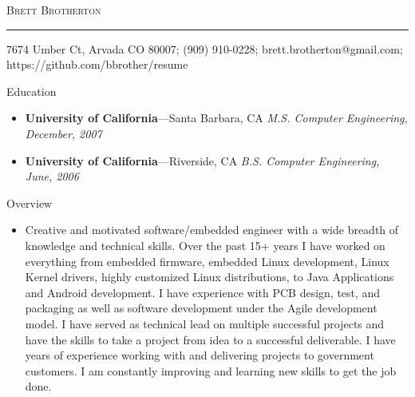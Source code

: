 \documentclass[10pt,oneside]{article}
\makeatletter
\newcommand{\name}{Brett Brotherton}
\newcommand{\addr}{7674 Umber Ct, Arvada CO 80007}
\newcommand{\phone}{(909) 910-0228}
\newcommand{\email}{brett.brotherton@gmail.com}
\newcommand{\website}{https://github.com/bbrother/resume}
\newcommand{\bigname}[1]{
  \begin{center}\fontfamily{cmr}\selectfont\Huge\scshape#1\end{center}
}
\newenvironment{ressection}[1]{
  \vspace{-2pt}
  {\fontfamily{cmr}\selectfont\Large#1}
  \begin{itemize}
  \vspace{-1pt}
}{
  \end{itemize}
}
\newcommand{\resitem}[1]{
  \vspace{-4pt}
  \item \begin{flushleft} #1 \end{flushleft}
}
\newcommand{\resbigitem}[3]{
  \vspace{-5pt}
  \item
  \textbf{#1}---#2 \hfill \textit{#3}
}
\newenvironment{ressubsec2}[3]{
  \resbigitem{#1}{#2}{#3}
  \vspace{-2pt}
}
\makeatother
\begin{document}
 \selectfont

\bigname{\name}

\vspace{-8pt} \rule{\textwidth}{1pt}

\vspace{-1pt} {\small\itshape \begin{center}\addr ; \phone; \email ; \website \end{center}}

\vspace{8 pt}



\begin{ressection}{Education}

  \begin{ressubsec2}{University of California}{Santa Barbara, CA}{M.S. Computer Engineering, December, 2007}
  \end{ressubsec2}

  \begin{ressubsec2}{University of California}{Riverside, CA}{B.S. Computer Engineering, June, 2006}
  \end{ressubsec2}

\end{ressection}
\begin{ressection}{Overview}
  \resitem{Creative and motivated software/embedded engineer with a wide breadth of knowledge and technical skills.
           Over the past 15+ years I have worked on everything from embedded firmware, embedded Linux development,
           Linux Kernel drivers, highly customized Linux distributions, to Java Applications and Android development.
           I have experience with PCB design, test, and packaging as well as software development under the Agile
           development model. I have served as technical lead on multiple successful projects and have the skills to
           take a project from idea to a successful deliverable.  I have years of experience working with and delivering
           projects to government customers. I am constantly improving and learning new skills to get the job done.}
\end{ressection}
\end{document}
